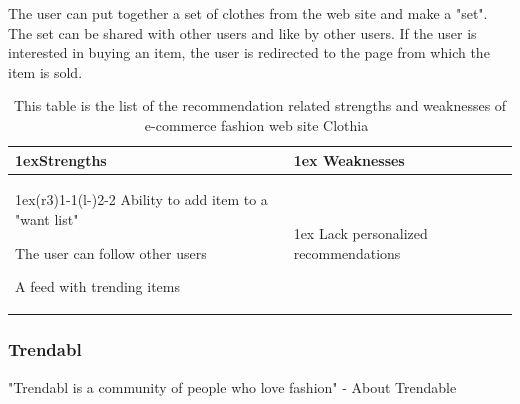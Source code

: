     The user can put together a set of clothes from the web site and make a "set".
    The set can be shared with other users and like by other users.
    If the user is interested in buying an item, the user is redirected to the page from which the item is sold.
    \begin{table}[H]
                \centering
                \begin{tabularx}{\linewidth}{>{\parskip1ex}X@{\kern4\tabcolsep}>{\parskip1ex}X}
                \toprule
                \hfil\bfseries Strengths
                &
                \hfil\bfseries Weaknesses
                \\\cmidrule(r{3\tabcolsep}){1-1}\cmidrule(l{-\tabcolsep}){2-2}
                Ability to add item to a "want list" \par
                The user can follow other users \par
                A feed with trending items \par
                &
                Lack personalized recommendations \par
                \\ \bottomrule
        \end{tabularx}
        \caption[Recommendation related strengths and weaknesses of Clothia~\cite{clothia}]{This table is the list of the recommendation related strengths and weaknesses of e-commerce fashion web site Clothia~\cite{clothia}}
        \label{table:ecommenreceClothia}
    \end{table}

\subsubsection{Trendabl} %
\label{par:trendabl}
    "Trendabl is a community of people who love fashion" - About Trendable~\cite{trendabl}

